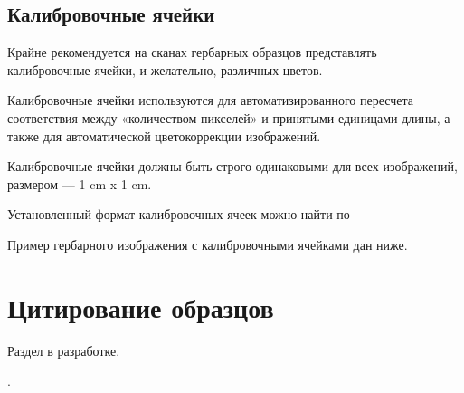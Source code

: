 \documentclass[letterpaper,10pt,russian]{sphinxmanual}
\begin{document}
\section{Калибровочные ячейки}
\label{\detokenize{scanning:id10}}
Крайне рекомендуется на сканах гербарных образцов представлять калибровочные ячейки,
и желательно, различных цветов.

Калибровочные ячейки используются для автоматизированного пересчета соответствия между «количеством пикселей» и
принятыми единицами длины, а также для автоматической цветокоррекции изображений.

Калибровочные ячейки должны быть строго одинаковыми для всех изображений, размером — 1 cm x 1 cm.

Установленный формат калибровочных ячеек
можно найти по 

\ignorespaces 
Пример гербарного изображения с калибровочными ячейками дан ниже.


\ignorespaces 

\chapter{Цитирование образцов}
\label{\detokenize{citing::doc}}\label{\detokenize{citing:id1}}\label{\detokenize{citing:index-0}}
Раздел в разработке.

.



\renewcommand{\indexname}{Алфавитный указатель}
\printindex
\end{document}
